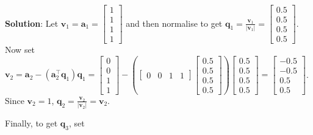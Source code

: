{\bf Solution}: 
Let $ \mathbf{v}_1 = \mathbf{a}_1 = 
 \left[\begin{array}{c}1\\1\\1\\1\end{array}\right] $ and then normalise to get 
$ \mathbf{q}_1 =   \frac{ \mathbf{v}_1 }{ | \mathbf{v}_1 | } = \left[\begin{array}{c}0.5\\0.5\\0.5\\0.5\end{array}\right]$. 
Now set $ \mathbf{v}_2 = \mathbf a_2  - (\mathbf a_2^\top \mathbf q_1)\mathbf q_1  = \left[ \begin{array}{c}0\\0\\1\\1\end{array} \right] -
\left(
       \left[ \begin{array}{cccc}0&0&1&1\end{array}\right] 
       \left[ \begin{array}{c}0.5\\0.5\\0.5\\0.5\end{array} \right]
\right) \left[ \begin{array}{c}0.5\\0.5\\0.5\\0.5\end{array} \right] = \left[ \begin{array}{r}-0.5\\-0.5\\0.5\\0.5\end{array} \right] $.  Since $\mathbf v_2 = 1$, $\mathbf q_2 = \frac{\mathbf v_2}{| \mathbf v_2|} = \mathbf v_2$.

Finally, to get $\mathbf q_3$, set 

